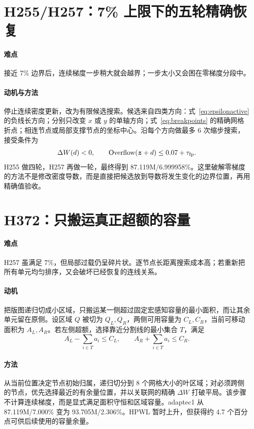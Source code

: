 \documentclass[UTF8,a4paper,11pt]{ctexrep}
\newcommand{\Overflow}{\operatorname{Overflow}}
\begin{document}
\section{H255/H257：7\% 上限下的五轮精确恢复}
\paragraph{难点}
接近 7\% 边界后，连续梯度一步稍大就会越界；一步太小又会困在零梯度分段中。

\paragraph{动机与方法}
停止连续密度更新，改为有限候选搜索。候选来自四类方向：式~\eqref{eq:epsilonactive} 的负线长方向；分别只改变 $x$ 或 $y$ 的单轴方向；式~\eqref{eq:breakpoints} 的精确网格折点；相连节点或局部支撑节点的坐标中心。沿每个方向做最多 6 次缩步搜索，接受条件为
\begin{equation}
 \Delta W(d)<0,\qquad \Overflow(\bm z+d)\le0.07+\tau_{\rm fp}. \label{eq:cap7}
\end{equation}
H255 做四轮，H257 再做一轮，最终得到 87.119M/6.999958\%。这里破解零梯度的方法不是修改密度导数，而是直接把候选放到导数将发生变化的边界位置，再用精确值验收。

\section{H372：只搬运真正超额的容量}
\paragraph{难点}
H257 虽满足 7\%，但局部过载仍呈碎片状。逐节点长距离搜索成本高；若重新把所有单元均匀排序，又会破坏已经恢复的连线关系。

\paragraph{动机}
把版图递归切成小区域，只搬运某一侧超过固定宏感知容量的最小面积，而让其余单元留在原侧。设区域 $Q$ 被切为 $Q_L,Q_R$，两侧可用容量为 $C_L,C_R$，当前可移动面积为 $A_L,A_R$。若左侧超额，选择靠近分割线的最小集合 $T$，满足
\begin{equation}
 A_L-\sum_{i\in T}a_i\le C_L,
 \qquad A_R+\sum_{i\in T}a_i\le C_R. \label{eq:surplus}
\end{equation}

\paragraph{方法}
从当前位置决定节点初始归属，递归切分到 8 个网格大小的叶区域；对必须跨侧的节点，优先选择最近的有余量位置，并以关联网的精确 $\Delta W$ 打破平局。该步骤不计算连续梯度，而是显式满足面积守恒和区域容量。adaptec1 从 87.119M/7.000\% 变为 93.705M/2.306\%。HPWL 暂时上升，但获得约 4.7 个百分点可供后续使用的容量余量。
\end{document}

